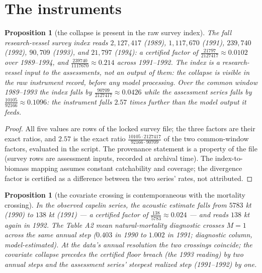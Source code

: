 \documentclass[10pt,twocolumn]{article}
\theoremstyle{plain}
\newtheorem{proposition}[theorem]{Proposition}
\theoremstyle{remark}
\begin{document}
\section{The instruments}\label{instruments}

\begin{proposition}[the collapse is present in the raw survey index]
\label{prop:survey}
The fall research-vessel survey index reads \(2{,}127{,}417\) (1989),
\(1{,}117{,}670\) (1991), \(239{,}740\) (1992), \(90{,}709\) (1993),
and \(21{,}797\) (1994): a certified factor of
\(\tfrac{21797}{2127417} \approx 0.0102\) over 1989--1994, and
\(\tfrac{239740}{1117670} \approx 0.214\) across 1991--1992. The index
is a research-vessel input to the assessments, not an output of them:
the collapse is visible in the raw instrument record, before any model
processing. Over the common window 1989--1993 the index falls by
\(\tfrac{90709}{2127417} \approx 0.0426\) while the assessment series
falls by \(\tfrac{10105}{92166} \approx 0.1096\): the instrument falls
\(2.57\) times further than the model output it feeds.
\end{proposition}

\begin{proof}
All five values are rows of the locked survey file; the three factors
are their exact ratios, and \(2.57\) is the exact ratio
\(\tfrac{10105 \cdot 2127417}{92166 \cdot 90709}\) of the two
common-window factors, evaluated in the script. The provenance
statement is a property of the file (survey rows are assessment
inputs, recorded at archival time). The index-to-biomass mapping
assumes constant catchability and coverage; the divergence factor is
certified as a difference between the two series' rates, not attributed.
\end{proof}

\begin{proposition}[the covariate crossing is contemporaneous with the
mortality crossing]\label{prop:capelin}
In the observed capelin series, the acoustic estimate falls from
\(5783\) kt (1990) to \(138\) kt (1991) --- a certified factor of
\(\tfrac{138}{5783} \approx 0.024\) --- and reads \(138\) kt again in
1992. The Table A2 mean natural-mortality diagnostic crosses
\(M = 1\) across the same annual step (\(0.403\) in 1990 to \(1.002\)
in 1991; diagnostic column, model-estimated). At the data's annual
resolution the two crossings coincide; the covariate collapse precedes
the certified floor breach (the 1993 reading) by two annual steps and
the assessment series' steepest realized step (1991--1992) by one.
\end{proposition}
\end{document}
